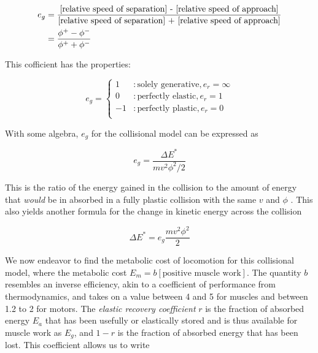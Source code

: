 \begin{align}
e_{g} &= \frac{\mbox{[relative speed of separation] - [relative speed of approach]}}{\mbox{[relative speed of separation] + [relative speed of approach]}} \notag \\
&= \frac{\phi^{+} - \phi^{-}}{\phi^{+} + \phi^{-}}
\label{eq:CoefficientOfGeneration}
\end{align}

This cofficient has the properties:

\begin{displaymath}
   e_{g} = \left\{
     \begin{array}{ll}
     	1 & : \mbox{solely generative}, e_{r} = \infty\\
        0 & : \mbox{perfectly elastic}, e_{r} = 1\\
       -1 & : \mbox{perfectly plastic}, e_{r} = 0\\
     \end{array}
   \right.
\end{displaymath}

With some algebra,  $e_{g}$ for the collisional model can be expressed as 

\begin{displaymath}
e_{g}=\frac{\Delta E^{*}}{mv^{2}\phi^{2}/2}
\end{displaymath}

This is the ratio of the energy gained in the collision to the amount of energy that \emph{would} be in absorbed in a fully plastic collision with the same $v$ and $\phi$ \cite{ruina05}. This also yields another formula for the change in kinetic energy across the collision

\begin{equation}
\Delta E^{*} = e_{g} \frac{mv^{2} \phi^{2}}{2}
\label{eq:GenerateAbsorbKE3}
\end{equation}

We now endeavor to find the metabolic cost of locomotion for this collisional model, where the metabolic cost $E_{m} = b[\mbox{positive muscle work}]$. The quantity $b$ resembles an inverse efficiency, akin to a coefficient of performance from thermodynamics, and takes on a value between 4 and 5 for muscles and between 1.2 to 2 for motors. The \textit{elastic recovery coefficient}   $r$ is the fraction of absorbed energy $E_{a}$ that has been usefully or elastically stored and is thus available for muscle work as $E_{g}$, and $1-r$ is the fraction of absorbed energy that has been lost. This coefficient allows us to write

